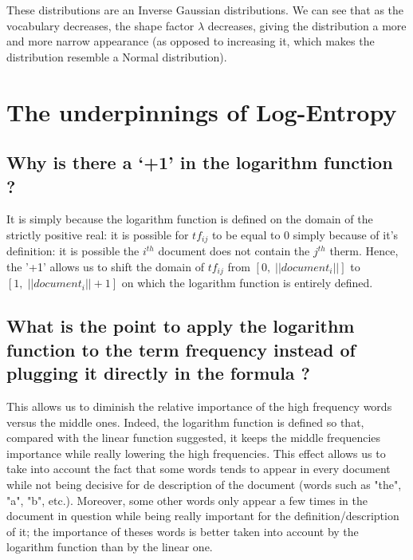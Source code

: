 \documentclass[10pt, a4paper, oneside]{article} %
\begin{document}
\pagebreak

These distributions are an Inverse Gaussian distributions. We can see that as the vocabulary decreases, the shape factor $\lambda$ decreases, giving the distribution a more and more narrow appearance (as opposed to increasing it, which makes the distribution resemble a Normal distribution).


\section{The underpinnings of Log-Entropy}
\subsection{Why is there a ‘+1’ in the logarithm function ?}
It is simply because the logarithm function is defined on the domain of the strictly positive real: it is possible for $tf_{ij}$ to be equal to 0 simply because of it's definition: it is possible the $i^{th}$ document does not contain the $j^{th}$ therm. Hence, the '+1' allows us to shift the domain of $tf_{ij}$ from $[0,\; \vert\vert document_i \vert\vert ]$ to $[1,\; \vert\vert document_i \vert\vert +1 ]$ on which the logarithm function is entirely defined.
\subsection{What is the point to apply the logarithm function to the term frequency instead of plugging it directly in the formula ?}
This allows us to diminish the relative importance of the high frequency words versus the middle ones. Indeed, the logarithm function is defined so that, compared with the linear function suggested, it keeps the middle frequencies importance while really lowering the high frequencies. This effect allows us to take into account the fact that some words tends to appear in every document while not being decisive for de description of the document (words such as "the", "a", "b", etc.). Moreover, some other words only appear a few times in the document in question while being really important for the definition/description of it; the importance of theses words is better taken into account by the logarithm function than by the linear one.
\end{document}
